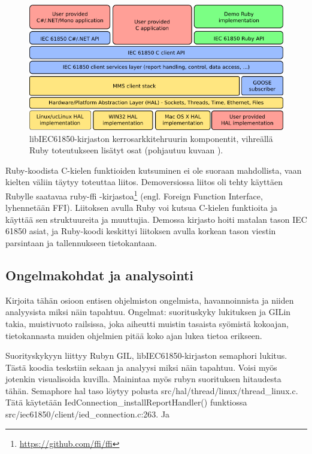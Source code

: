 \begin{figure}
	\includegraphics[width=1\textwidth]{pictures/libiec61850-layer-architecture.png}
	\caption{libIEC61850-kirjaston kerrosarkkitehruurin komponentit, vihreällä Ruby toteutukseen lisätyt osat (pohjautuu kuvaan \cite{libIEC61850-api-overview}).}
	\label{fig:libiec61850-layer-architecture}
\end{figure}

Ruby-koodista C-kielen funktioiden kutsuminen ei ole suoraan mahdollista, vaan kielten väliin täytyy toteuttaa liitos. Demoversiossa liitos oli tehty käyttäen Rubylle saatavaa ruby-ffi -kirjastoa\footnote{\url{https://github.com/ffi/ffi}} (engl. Foreign Function Interface, lyhennetään FFI). Liitoksen avulla Ruby voi kutsua C-kielen funktioita ja käyttää sen struktuureita ja muuttujia. Demossa kirjasto hoiti matalan tason IEC 61850 asiat, ja Ruby-koodi keskittyi liitoksen avulla korkean tason viestin parsintaan ja tallennukseen tietokantaan.


\subsection{Ongelmakohdat ja analysointi}
\begin{it}
	Kirjoita tähän osioon entisen ohjelmiston ongelmista, havannoinnista ja niiden analyysista miksi näin tapahtuu.
	Ongelmat: suorituskyky lukituksen ja GILin takia, muistivuoto railsissa, joka aiheutti muistin tasaista syömistä kokoajan, tietokannasta muiden ohjelmien pitää koko ajan lukea tietoa erikseen.

	Suorityskykyyn liittyy Rubyn GIL, libIEC61850-kirjaston semaphori lukitus. Tästä koodia teskstiin sekaan ja analyysi miksi näin tapahtuu. Voisi myös jotenkin visualisoida kuvilla. Mainintaa myös rubyn suorituksen hitaudesta tähän.
	Semaphore hal taso löytyy polusta src/hal/thread/linux/thread\_linux.c.
	Tätä käytetään IedConnection\_installReportHandler() funktiossa src/iec61850/client/ied\_connection.c:263. Ja 
\end{it}


